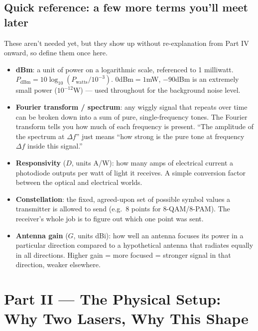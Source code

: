 \documentclass[11pt]{article}
\begin{document}
\subsection*{Quick reference: a few more terms you'll meet later}
These aren't needed yet, but they show up without re-explanation from Part IV onward, so define them once here.
\begin{itemize}[nosep]
\item \textbf{dBm}: a unit of power on a logarithmic scale, referenced to 1 milliwatt. $P_{\text{dBm}}=10\log_{10}(P_{\text{watts}}/10^{-3})$. $0$dBm$=1$mW, $-90$dBm is an extremely small power ($10^{-12}$W) --- used throughout for the background noise level.
\item \textbf{Fourier transform / spectrum}: any wiggly signal that repeats over time can be broken down into a sum of pure, single-frequency tones. The Fourier transform tells you how much of each frequency is present. ``The amplitude of the spectrum at $\Delta f$'' just means ``how strong is the pure tone at frequency $\Delta f$ inside this signal.''
\item \textbf{Responsivity} ($D$, units A/W): how many amps of electrical current a photodiode outputs per watt of light it receives. A simple conversion factor between the optical and electrical worlds.
\item \textbf{Constellation}: the fixed, agreed-upon set of possible symbol values a transmitter is allowed to send (e.g.\ 8 points for 8-QAM/8-PAM). The receiver's whole job is to figure out which one point was sent.
\item \textbf{Antenna gain} ($G$, units dBi): how well an antenna focuses its power in a particular direction compared to a hypothetical antenna that radiates equally in all directions. Higher gain = more focused = stronger signal in that direction, weaker elsewhere.
\end{itemize}

\newpage
\section{Part II --- The Physical Setup: Why Two Lasers, Why This Shape}
\end{document}
